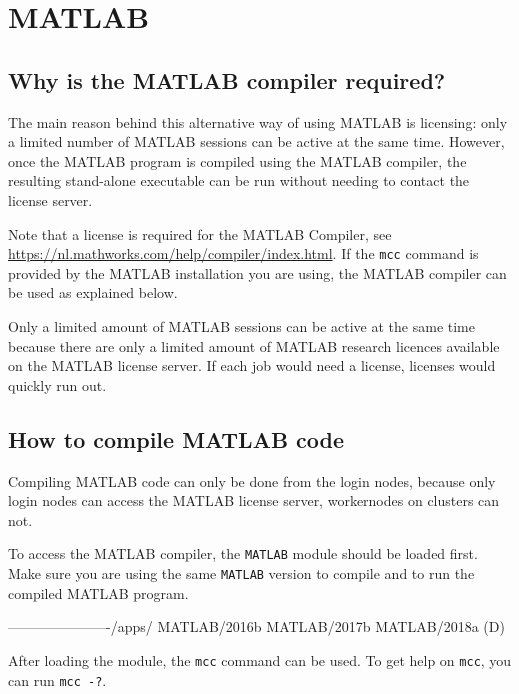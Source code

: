 \chapter{MATLAB}
\label{ch:matlab}

\section{Why is the MATLAB compiler required?}

The main reason behind this alternative way of using MATLAB is licensing: only
a limited number of MATLAB sessions can be active at the same time. However, once
the MATLAB program is compiled using the MATLAB compiler, the resulting stand-alone
executable can be run without needing to contact the license server.

Note that a license is required for the MATLAB Compiler,
see \url{https://nl.mathworks.com/help/compiler/index.html}. If the \verb|mcc|
command is provided by the MATLAB installation you are using, the MATLAB compiler
can be used as explained below.

\ifgent
Only a limited amount of MATLAB sessions can be active at the same time because
there are only a limited amount of MATLAB research licences available on
the \university MATLAB license server. If each job would need a license,
licenses would quickly run out.
\fi

\section{How to compile MATLAB code}

Compiling MATLAB code can only be done from the login nodes, because only login
nodes can access the MATLAB license server, workernodes on clusters can not.

To access the MATLAB compiler, the \verb|MATLAB| module should be loaded first. Make sure
you are using the same \verb|MATLAB| version to compile and to run the compiled MATLAB
program.

\begin{prompt}
----------------------/apps/%
   MATLAB/2016b    MATLAB/2017b    MATLAB/2018a (D)
\end{prompt}

After loading the module, the \verb|mcc| command can be used. To get help on
\verb|mcc|, you can run \verb|mcc -?|.

